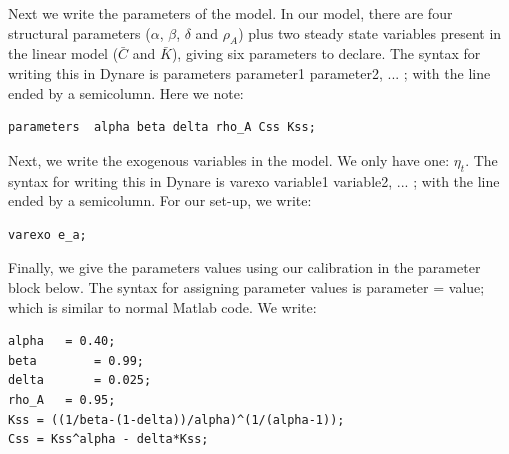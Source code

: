 \documentclass[a4paper,12pt]{article}%
\begin{document}
Next we write the parameters of the model. In our model, there are four
structural parameters ($\alpha$, $\beta$, $\delta$ and $\rho_{A}$) plus two
steady state variables present in the linear model ($\bar{C}$ and $\bar{K}$),
giving six parameters to declare. The syntax for writing this in Dynare is
\textsf{parameters parameter1 parameter2, ... ;} with the line ended by a
semicolumn. Here we note:%

\vspace{1ex}
\begin{verbatim}
parameters  alpha beta delta rho_A Css Kss;
\end{verbatim}
\vspace{1ex}%


Next, we write the exogenous variables in the model. We only have one:
$\eta_{t}$. The syntax for writing this in Dynare is\textsf{ varexo variable1
variable2, ... ;} with the line ended by a semicolumn. For our set-up, we write:%

\vspace{1ex}
\begin{verbatim}
varexo e_a;
\end{verbatim}
\vspace{1ex}%


Finally, we give the parameters values using our calibration
in the parameter block below. The syntax for assigning parameter values is
\textsf{parameter = value;} which is similar to normal Matlab code. We write:%

\vspace{1ex}
\begin{verbatim}
alpha	= 0.40;		
beta    	= 0.99;		
delta    	= 0.025;		
rho_A	= 0.95;		
Kss	= ((1/beta-(1-delta))/alpha)^(1/(alpha-1));
Css	= Kss^alpha - delta*Kss;
\end{verbatim}
\vspace{1ex}%
\end{document}
